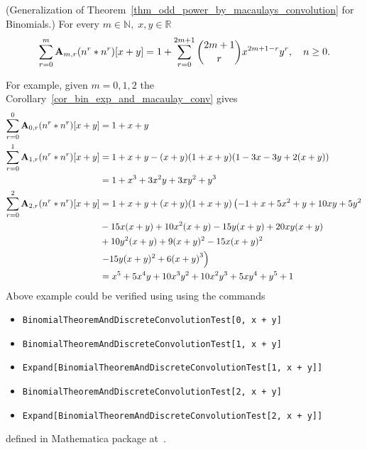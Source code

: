 \begin{cor}
    \label{cor_bin_exp_and_macaulay_conv}
    (Generalization of Theorem~\ref{thm_odd_power_by_macaulays_convolution} for Binomials.)
    For every $m\in\mathbb{N}, \; x,y\in\mathbb{R}$
    \begin{equation*}
        \sum_{r=0}^{m} {\mathbf{A}} \sb{m,r} (n \sp{r} \ast n \sp{r}) [x+y]
        =
        1 + \sum_{r=0}^{2m+1} \binom{2m+1}{r} x^{2m+1-r} y^r, \quad n\geq 0.
    \end{equation*}
\end{cor}
For example, given $m=0,1,2$ the Corollary~\ref{cor_bin_exp_and_macaulay_conv} gives
\begin{equation*}
    \begin{split}
        \sum_{r=0}^{0} {\mathbf{A}} \sb{0,r} (n \sp{r} \ast n \sp{r}) [x+y]
        &= 1 + x + y \\
        \sum_{r=0}^{1} {\mathbf{A}} \sb{1,r} (n \sp{r} \ast n \sp{r}) [x+y]
        &= 1 + x + y - (x + y) (1 + x + y) (1 - 3 x - 3 y + 2 (x + y)) \\
        &= 1 + x^3 + 3 x^2 y + 3 x y^2 + y^3\\
        \sum_{r=0}^{2} {\mathbf{A}} \sb{2,r} (n \sp{r} \ast n \sp{r}) [x+y]
        &=1 + x + y + (x + y) (1 + x + y) \left(-1 + x + 5 x^2 + y + 10 x y + 5 y^2\right. \\
        &-15 x (x + y) + 10 x^2 (x + y) - 15 y (x + y) + 20 x y (x + y) \\
        &+ 10 y^2 (x + y) +9 (x + y)^2 - 15 x (x + y)^2 \\
        &\left.-15 y (x + y)^{2} + 6 {(x + y)}^{3}\right) \\
        &=x^5 + 5 x^4 y + 10 x^3 y^2 + 10 x^2 y^3 + 5 x y^4 + y^5 + 1
    \end{split}
\end{equation*}
Above example could be verified using using the commands
\begin{itemize}
    \item \texttt{BinomialTheoremAndDiscreteConvolutionTest[0, x + y]}
    \item \texttt{BinomialTheoremAndDiscreteConvolutionTest[1, x + y]}
    \item \texttt{Expand[BinomialTheoremAndDiscreteConvolutionTest[1, x + y]]}
    \item \texttt{BinomialTheoremAndDiscreteConvolutionTest[2, x + y]}
    \item \texttt{Expand[BinomialTheoremAndDiscreteConvolutionTest[2, x + y]]}
\end{itemize}
defined in Mathematica package at~\cite{PK22Source}.
